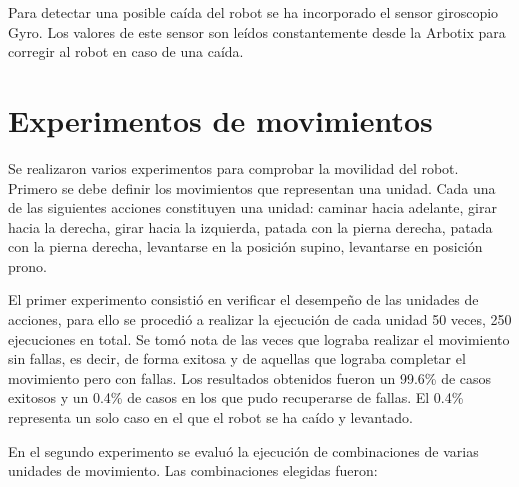 \documentclass[tikz,conference, letterpaper]{IEEEtranMC1}
\begin{document}
Para detectar una posible caída del robot se ha incorporado el sensor giroscopio Gyro. Los valores de este sensor son leídos constantemente desde la Arbotix para corregir al robot en caso de una caída.  

\section{Experimentos de movimientos }
\label{sec:experimento}



Se realizaron varios experimentos para comprobar la movilidad del robot. Primero se debe definir los movimientos que representan una unidad. Cada una de las siguientes acciones constituyen una unidad: caminar hacia adelante, girar hacia la derecha, girar hacia la izquierda, patada con la pierna derecha, patada con la pierna derecha, levantarse en la posición supino, levantarse en posición prono.

El primer experimento consistió en verificar el desempeño de las unidades de acciones, para ello se procedió a realizar la ejecución de cada unidad 50 veces, 250 ejecuciones en total. Se tomó nota de las veces que lograba realizar el movimiento sin fallas, es decir, de forma exitosa y de aquellas que lograba completar el movimiento pero con fallas. Los resultados obtenidos fueron un 99.6\% de casos exitosos y un 0.4\% de casos en los que pudo recuperarse de fallas. El 0.4\% representa un solo caso en el que el robot se ha caído y levantado.  

En el segundo experimento se evalu\'o la ejecuci\'on de  combinaciones de varias unidades de movimiento. Las combinaciones elegidas fueron: 
\end{document}
